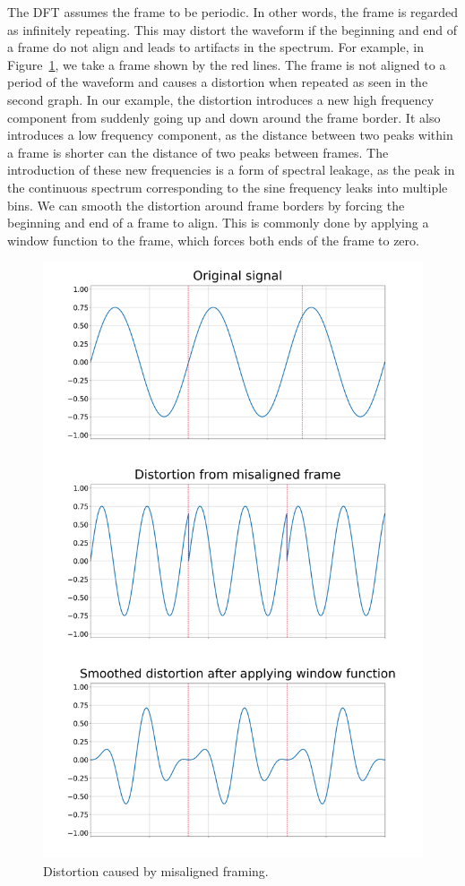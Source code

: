 \documentclass[a4paper,10pt,twocolumn]{article}
\begin{document}
The DFT assumes the frame to be periodic. In other words, the frame is regarded as infinitely repeating. This may distort the waveform if the beginning and end of a frame do not align and leads to artifacts in the spectrum. For example, in Figure~\ref{fig:framedistortion}, we take a frame shown by the red lines. The frame is not aligned to a period of the waveform and causes a distortion when repeated as seen in the second graph. %
In our example, the distortion introduces a new high frequency component from suddenly going up and down around the frame border. It also introduces a low frequency component, as the distance between two peaks within a frame is shorter can the distance of two peaks between frames. The introduction of these new frequencies is a form of spectral leakage, as the peak in the continuous spectrum corresponding to the sine frequency leaks into multiple bins. We can smooth the distortion around frame borders by forcing the beginning and end of a frame to align. This is commonly done by applying a window function to the frame, which forces both ends of the frame to zero.
\begin{figure}[h]
    \centering
    \includegraphics[width=\linewidth]{fig/framedistortion.png}
    \caption{Distortion caused by misaligned framing.}
    \label{fig:framedistortion}
\end{figure}
\end{document}
